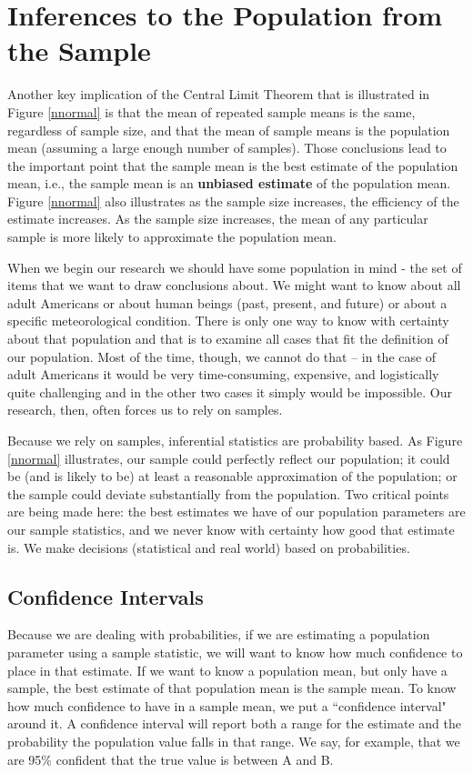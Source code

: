 \documentclass[11pt,openany]{book}\usepackage[]{graphicx}\usepackage[]{color}
\begin{document}
{\section{Inferences to the Population from the Sample}

Another key implication of the Central Limit Theorem that is illustrated in Figure \ref{nnormal} is that the mean of repeated sample means is the same, regardless of sample size, and that the mean of sample means is the population mean (assuming a large enough number of samples).   Those conclusions lead to the important point that the sample mean is the best estimate of the population mean, i.e., the sample mean is an \textbf{unbiased estimate} of the population mean.  Figure \ref{nnormal} also illustrates as the sample size increases, the efficiency of the estimate increases.  As the sample size increases, the mean of any particular sample is more likely to approximate the population mean.

When we begin our research we should have some population in mind - the set of items that we want to draw conclusions about.  We might want to know about all adult Americans or about human beings (past, present, and future) or about a specific meteorological condition.   There is only one way to know with certainty about that population and that is to examine all cases that fit the definition of our population.  Most of the time, though, we cannot do that  -- in the case of adult Americans it would be very time-consuming, expensive, and logistically quite challenging and in the other two cases it simply would be impossible.  Our research, then, often forces us to rely on samples.  
  
Because we rely on samples, inferential statistics are probability based.  As Figure \ref{nnormal} illustrates, our sample could perfectly reflect our population; it could be (and is likely to be) at least a reasonable approximation of the population; or the sample could deviate substantially from the population.  Two critical points are being made here:  the best estimates we have of our population parameters are our sample statistics, and we never know with certainty how good that estimate is.  We make decisions (statistical and real world) based on probabilities.
	
\subsection{Confidence Intervals}

Because we are dealing with probabilities, if we are estimating a population parameter using a sample statistic, we will want to know how much confidence to place in that estimate.  If we want to know a population mean, but only have a sample, the best estimate of that population mean is the sample mean.  To know how much confidence to have in a sample mean, we put a ``confidence interval" around it.  A confidence interval will report both a range for the estimate and the probability the population value falls in that range.  We say, for example, that we are 95\% confident that the true value is between A and B.

}
\end{document}
